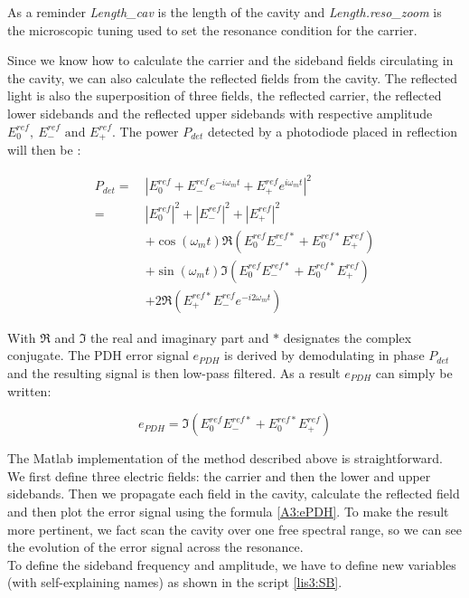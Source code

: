 As a reminder \textsl{Length\_cav} is the length of the cavity and \textsl{Length.reso\_zoom} is the microscopic tuning used to set the resonance condition for the carrier.

Since we know how to calculate the carrier and the sideband fields circulating in the cavity, we can also calculate the reflected fields from the cavity. The reflected light is also the superposition of three fields, the reflected carrier, the reflected lower sidebands and the reflected upper sidebands with respective amplitude $E_0^{ref},\ E_-^{ref} \text{ and } E_+^{ref}$. The power $P_{det}$ detected by a photodiode placed in reflection will then be :

\begin{equation}
\begin{split}
P_{det} =\ & |E_0^{ref} +  E_-^{ref}e^{-i \omega_m t} + E_+^{ref}e^{i \omega_m t}|^2 \\
     =\ & |E_0^{ref}|^2 + |E_-^{ref}|^2 + |E_+^{ref}|^2\\
    & + \cos(\omega_m t) \Re(E_0^{ref}E_-^{ref \ast}+E_0^{ref \ast}E_+^{ref})\\
    & + \sin(\omega_m t) \Im(E_0^{ref}E_-^{ref \ast}+E_0^{ref \ast}E_+^{ref})\\
    & + 2 \Re(E_+^{ref \ast}E_-^{ref} e^{-i 2\omega_m t})
\end{split}
\end{equation}

With $\Re$ and $\Im$ the real and imaginary part and $\ast$ designates the complex conjugate. The PDH error signal $e_{PDH}$ is derived by demodulating in phase $P_{det}$ and the resulting signal is then low-pass filtered. As a result $e_{PDH}$ can simply be written:

\begin{equation}
e_{PDH} = \Im(E_0^{ref}E_-^{ref \ast}+E_0^{ref \ast}E_+^{ref})
\label{A3:ePDH}
\end{equation}

The Matlab implementation of the method described above is straightforward. We first define three electric fields: the carrier and then the lower and upper sidebands. Then we propagate each field in the cavity, calculate the reflected field and then plot the error signal using the formula \ref{A3:ePDH}. To make the result more pertinent, we fact scan the cavity over one free spectral range, so we can see the evolution of the error signal across the resonance.\\

To define the sideband frequency and amplitude, we have to define new variables (with self-explaining names) as shown in the script \ref{lis3:SB}.\\

